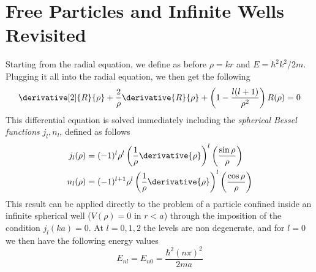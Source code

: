 \documentclass[a4paper, 11pt]{book}
\newcommand{\1}{\opr{\mathds{1}}}
\theoremstyle{plain}
\begin{document}
	\section{Free Particles and Infinite Wells Revisited}
	Starting from the radial equation, we define as before $\rho=kr$ and $E=\hbar^2k^2/2m$. Plugging it all into the radial equation, we then get the following
	\begin{equation}
		\derivative[2]{R}{\rho}+\frac{2}{\rho}\derivative{R}{\rho}+\left( 1-\frac{l(l+1)}{\rho^2} \right)R(\rho)=0
		\label{eq:freeparticle3d}
	\end{equation}
	This differential equation is solved immediately including the \textit{spherical Bessel functions} $j_l,n_l$, defined as follows
	\begin{equation}
		\begin{aligned}
			j_l(\rho)&=(-1)^l\rho^l\left( \frac{1}{\rho}\derivative{\rho} \right)^l\left( \frac{\sin\rho}{\rho} \right)\\
			n_l(\rho)&=(-1)^{l+1}\rho^l\left( \frac{1}{\rho}\derivative{\rho} \right)^l\left( \frac{\cos\rho}{\rho} \right)
		\end{aligned}
		\label{eq:besselsphericalfunctionsfreep}
	\end{equation}
	This result can be applied directly to the problem of a particle confined inside an infinite spherical well ($V(\rho)=0$ in $r<a$) through the imposition of the condition $j_l(ka)=0$. At $l=0,1,2$ the levels are non degenerate, and for $l=0$ we then have the following energy values
	\begin{equation}
		E_{nl}=E_{n0}=\frac{\hbar^2(n\pi)^2}{2ma}
		\label{eq:enlsphinfwell}
	\end{equation}
\end{document}
